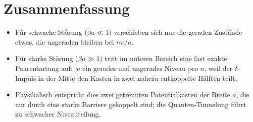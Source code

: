 \documentclass[a4paper,12pt]{article}
\begin{document}
\section*{Zusammenfassung}
\begin{itemize}
  \item Für schwache Störung ($\beta a\ll1$) verschieben sich nur die geraden Zustände etwas, 
    die ungeraden bleiben bei $n\pi/a$. 
  \item Für starke Störung ($\beta a\gg1$) tritt im unteren Bereich eine fast exakte 
    Paarentartung auf: je ein gerades und ungerades Niveau pro $n$, weil der $\delta$-Impuls 
    in der Mitte den Kasten in zwei nahezu entkoppelte Hälften teilt.
  \item Physikalisch entspricht dies zwei getrennten Potentialkästen der Breite $a$,
    die nur durch eine starke Barriere gekoppelt sind; die Quanten-Tunnelung führt 
    zu schwacher Niveauteilung.
\end{itemize}
\end{document}
